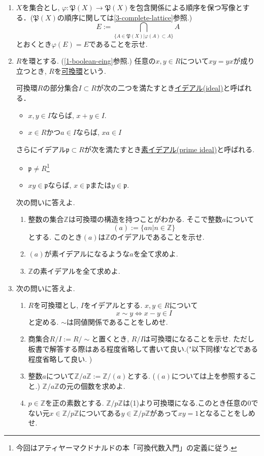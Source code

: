 \documentclass[dvipdfmx,a4paper,11pt]{article}
\newcommand{\Z}{\mathbb{Z}}
\theoremstyle{definition}
\begin{document}
\begin{enumerate}[label=\textbf{問}\ref*{sec-6}.\arabic*]
 \item $X$を集合とし, $\varphi : \mathfrak{P}(X) \to \mathfrak{P}(X)$を包含関係による順序を保つ写像とする．($\mathfrak{P}(X)$の順序に関しては\ref{3-complete-lattice}参照.)
 $$E:=\bigcap_{\{ A \in \mathfrak{P}(X) | \varphi(A) \subset A\}} A$$
 とおくとき$\varphi(E) =E$であることを示せ.
 
 \newpage
 \item $R$を環とする. (\ref{1-boolean-eing}参照.)
任意の$x,y \in R$について$xy=yx$が成り立つとき, $R$を\underline{可換環}という. 

可換環$R$の部分集合$I \subset R$が次の二つを満たすとき\underline{イデアル(ideal)}と呼ばれる．
 \begin{itemize}
 \setlength{\parskip}{0cm}
  \setlength{\itemsep}{0pt}
    \item $x,y \in I$ならば, $x+y \in I$.
    \item $x\in R$かつ$a \in I$ならば, $xa \in I$
\end{itemize}
さらにイデアル$\mathfrak{p}\subset R$が次を満たすとき\underline{素イデアル(prime ideal)}と呼ばれる.
 \begin{itemize}
 \setlength{\parskip}{0cm}
  \setlength{\itemsep}{0pt}
  \item $\mathfrak{p} \neq R$\footnote{今回はアティヤーマクドナルドの本「可換代数入門」の定義に従う. }
    \item $xy \in \mathfrak{p}$ならば, $x \in \mathfrak{p}$または$y \in \mathfrak{p}$.
\end{itemize}
次の問いに答えよ.  
    \begin{enumerate}[label=(\arabic*).]
 \setlength{\parskip}{0cm}
  \setlength{\itemsep}{0pt}
  \item 整数の集合$\Z$は可換環の構造を持つことがわかる. そこで整数$a$について
  $$
  (a):= \{ an | n \in \Z \}
  $$
  とする. このとき$(a)$は$\Z$のイデアルであることを示せ.
  \item $(a)$が素イデアルになるような$a$を全て求めよ. 
  \item $\Z$の素イデアルを全て求めよ.
  \end{enumerate}
  
  
\item 次の問いに答えよ. 
    \begin{enumerate}[label=(\arabic*).]
 \setlength{\parskip}{0cm}
  \setlength{\itemsep}{0pt}
\item $R$を可換環とし, $I$をイデアルとする. $x,y \in R$について
$$
x \sim y \Leftrightarrow x - y \in I
$$
と定める. $\sim$は同値関係であることをしめせ. 
\item 商集合$R/I:=R/\sim$と置くとき, $R/I$は可換環になることを示せ.
ただし板書で解答する際はある程度省略して書いて良い.("以下同様"などである程度省略して良い. )
\item  整数$a$について$\Z/a\Z:=\Z/(a)$とする. ($(a)$については上を参照すること.) $\Z/a\Z$の元の個数を求めよ. 
\item $p \in \Z$を正の素数とする. $\Z/p\Z$は(1)より可換環になる.このとき任意の0でない元$x \in \Z/p\Z$についてある$y \in \Z/p\Z$があって$xy=1$となることをしめせ. 
\end{enumerate}


\end{enumerate}
\end{document}
